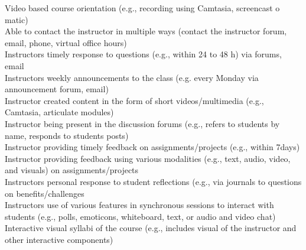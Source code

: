 Video based course orientation (e.g., recording using Camtasia, screencast o matic)\\
Able to contact the instructor in multiple ways (contact the instructor forum, email, phone, virtual office hours)\\
Instructors timely response to questions (e.g., within 24 to 48 h) via forums, email\\
Instructors weekly announcements to the class (e.g. every Monday via announcement forum, email)\\
Instructor created content in the form of short videos/multimedia (e.g., Camtasia, articulate modules)\\
Instructor being present in the discussion forums (e.g., refers to students by name, responds to students posts)\\
Instructor providing timely feedback on assignments/projects (e.g., within 7days)\\
Instructor providing feedback using various modalities (e.g., text, audio, video, and visuals) on assignments/projects\\
Instructors personal response to student reflections (e.g., via journals to questions on benefits/challenges\\
Instructors use of various features in synchronous sessions to interact with students (e.g., polls, emoticons, whiteboard, text, or audio and video chat)\\
Interactive visual syllabi of the course (e.g., includes visual of the instructor and other interactive components)\cite{Martin2018}\\
